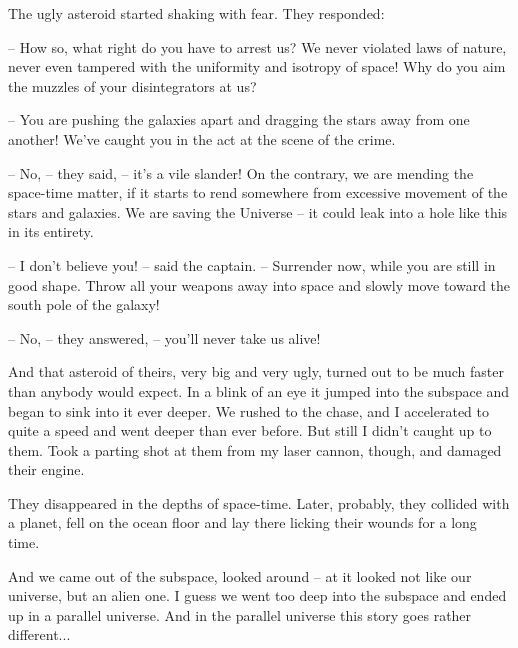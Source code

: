 \documentclass[ebook,twoside,final,openright]{memoir}
\begin{document}
The ugly asteroid started shaking with fear. They responded:\par
– How so, what right do you have to arrest us? We never violated laws of nature, never even tampered with the uniformity and isotropy of space! Why do you aim the muzzles of your disintegrators at us?\par
– You are pushing the galaxies apart and dragging the stars away from one another! We’ve caught you in the act at the scene of the crime.\par
– No, – they said, – it’s a vile slander! On the contrary, we are mending the space-time matter, if it starts to rend somewhere from excessive movement of the stars and galaxies. We are saving the Universe – it could leak into a hole like this in its entirety.\par
– I don’t believe you! – said the captain. – Surrender now, while you are still in good shape. Throw all your weapons away into space and slowly move toward the south pole of the galaxy!\par
– No, – they answered, – you’ll never take us alive!\par
And that asteroid of theirs, very big and very ugly, turned out to be much faster than anybody would expect. In a blink of an eye it jumped into the subspace and began to sink into it ever deeper. We rushed to the chase, and I accelerated to quite a speed and went deeper than ever before. But still I didn’t caught up to them. Took a parting shot at them from my laser cannon, though, and damaged their engine.\par
They disappeared in the depths of space-time. Later, probably, they collided with a planet, fell on the ocean floor and lay there licking their wounds for a long time.\par
And we came out of the subspace, looked around – at it looked not like our universe, but an alien one. I guess we went too deep into the subspace and ended up in a parallel universe. And in the parallel universe this story goes rather different...
\end{document}
